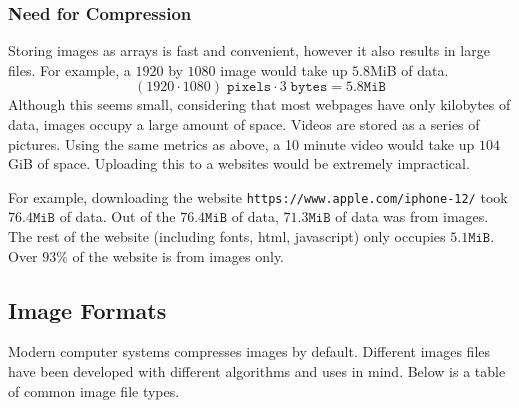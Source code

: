 \documentclass{article}
\begin{document}
\subsubsection{Need for Compression}
Storing images as arrays is fast and convenient, however it also results in large files.
For example, a $1920$ by $1080$ image would take up $5.8$MiB of data.
\begin{equation}
	(1920 \cdot 1080)\; \texttt{pixels} \cdot 3\; \texttt{bytes} = 5.8 \texttt{MiB}
\end{equation}
Although this seems small, considering that most webpages have only kilobytes of data, images occupy a large amount of space. 
Videos are stored as a series of pictures.
Using the same metrics as above, a 10 minute video would take up $104$GiB of space.
Uploading this to a websites would be extremely impractical.

For example, downloading the website \texttt{https://www.apple.com/iphone-12/} took $76.4\texttt{MiB}$ of data.
Out of the $76.4\texttt{MiB}$ of data, $71.3\texttt{MiB}$ of data was from images.
The rest of the website (including fonts, html, javascript) only occupies $5.1\texttt{MiB}$.
Over $93\%$ of the website is from images only.

\subsection{Image Formats}
Modern computer systems compresses images by default.
Different images files have been developed with different algorithms and uses in mind.
Below is a table of common image file types.
\end{document}
